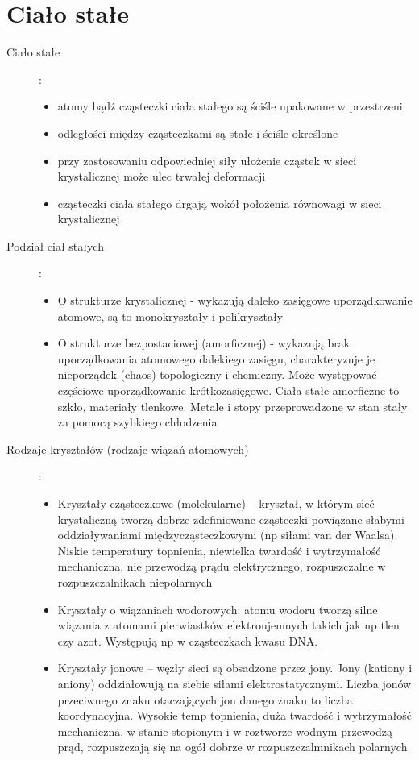 \documentclass[a4paper,11pt]{article}
\begin{document}
\section{Ciało stałe}
\begin{description}
\item[Ciało stałe]:
  \begin{itemize}
  \item atomy bądź cząsteczki ciała stałego są ściśle upakowane w przestrzeni
  \item odległości między cząsteczkami są stałe i ściśle określone
  \item przy zastosowaniu odpowiedniej siły ułożenie cząstek w sieci krystalicznej może ulec trwałej deformacji
  \item cząsteczki ciała stałego drgają wokół położenia równowagi w sieci krystalicznej
  \end{itemize}
\item[Podział ciał stałych]:
  \begin{itemize}
  \item O strukturze krystalicznej - wykazują daleko zasięgowe uporządkowanie atomowe, są to monokryształy i polikryształy
  \item O strukturze bezpostaciowej (amorficznej) - wykazują brak uporządkowania atomowego dalekiego zasięgu, charakteryzuje je nieporządek (chaos) topologiczny i chemiczny. Może występować częściowe uporządkowanie krótkozasięgowe. Ciała stałe amorficzne to szkło, materiały tlenkowe. Metale i stopy przeprowadzone w stan stały za pomocą szybkiego chłodzenia
  \end{itemize}
\item[Rodzaje kryształów (rodzaje wiązań atomowych)]:
  \begin{itemize}
  \item Kryształy cząsteczkowe (molekularne) -- kryształ, w którym sieć krystaliczną tworzą dobrze zdefiniowane cząsteczki powiązane słabymi oddziaływaniami międzycząsteczkowymi (np siłami van der Waalsa). Niskie temperatury topnienia, niewielka twardość i wytrzymałość mechaniczna, nie przewodzą prądu elektrycznego, rozpuszczalne w rozpuszczalnikach niepolarnych
  \item Kryształy o wiązaniach wodorowych: atomu wodoru tworzą silne wiązania z atomami pierwiastków elektroujemnych takich jak np tlen czy azot. Występują np w cząsteczkach kwasu DNA.
  \item Kryształy jonowe -- węzły sieci są obsadzone przez jony. Jony (kationy i aniony) oddziałowują na siebie siłami elektrostatycznymi. Liczba jonów przeciwnego znaku otaczających jon danego znaku to liczba koordynacyjna. Wysokie temp topnienia, duża twardość i wytrzymałość mechaniczna, w stanie stopionym i w roztworze wodnym przewodzą prąd, rozpuszczają się na ogół dobrze w rozpuszczalmnikach polarnych

\end{itemize}
\end{description}
\end{document}
